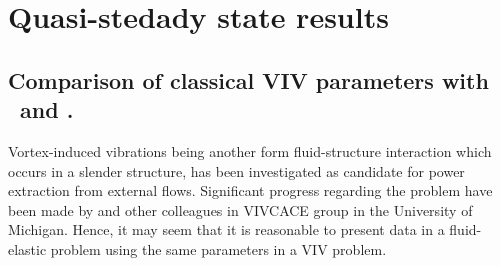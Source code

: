 \section{Quasi-stedady state results}

\subsection{Comparison of classical VIV parameters with \massstiff \ and \massdamp.}


Vortex-induced vibrations being another form fluid-structure interaction which occurs in a slender structure, has been investigated as candidate for power extraction from external flows. Significant progress regarding the problem have been made by \cite{Bernitsas2008a-concept,Bernitsas2009,Raghavan2010a,Lee2011b} and other colleagues in VIVCACE group in the University of Michigan. Hence, it may seem that it is reasonable to present data in a fluid-elastic problem using the same parameters in a VIV problem.














    


